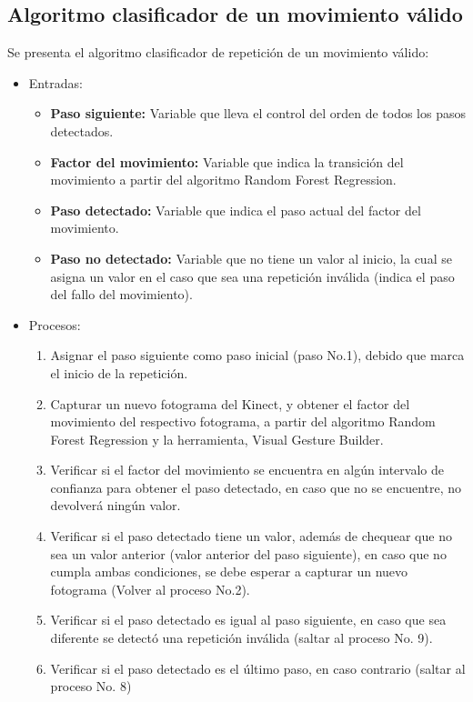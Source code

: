 \subsection{Algoritmo clasificador de un movimiento v\'alido}\label{dis:algoritmoDet}
Se presenta el algoritmo clasificador de repetici\'on de un movimiento v\'alido:
\begin{itemize}
\item Entradas:
\begin{itemize}
\item \textbf{Paso siguiente:} Variable que lleva el control del orden de todos los pasos detectados.
\item \textbf{Factor del movimiento:} Variable que indica la transici\'on del movimiento a partir del algoritmo Random Forest Regression.
\item \textbf{Paso detectado:} Variable que indica el paso actual del factor del movimiento.
\item \textbf{Paso no detectado:} Variable que no tiene un valor al inicio, la cual se asigna un valor en el caso que sea una repetici\'on inv\'alida (indica el paso del fallo del movimiento).
\end{itemize}
\item Procesos:
\begin{enumerate}[1.]
\item Asignar el paso siguiente como paso inicial (paso No.1), debido que marca el inicio de la repetici\'on. %
\item Capturar un nuevo fotograma del Kinect, y obtener el factor del movimiento del respectivo fotograma, a partir del algoritmo Random Forest Regression y la herramienta, Visual Gesture Builder. %
\item Verificar si el factor del movimiento se encuentra en alg\'un intervalo de confianza para obtener el paso detectado, en caso que no se encuentre, no devolver\'a ning\'un valor.  %
\item Verificar si el paso detectado tiene un valor, adem\'as de chequear que no sea un valor anterior (valor anterior del paso siguiente), en caso que no cumpla ambas condiciones, se debe esperar a capturar un nuevo fotograma (Volver al proceso No.2). %
\item Verificar si el paso detectado es igual al paso siguiente, en caso que sea diferente se detect\'o una repetici\'on inv\'alida (saltar al proceso No. 9). %
\item Verificar si el paso detectado es el \'ultimo paso, en caso contrario (saltar al proceso No. 8) %

\end{enumerate}
\end{itemize}
